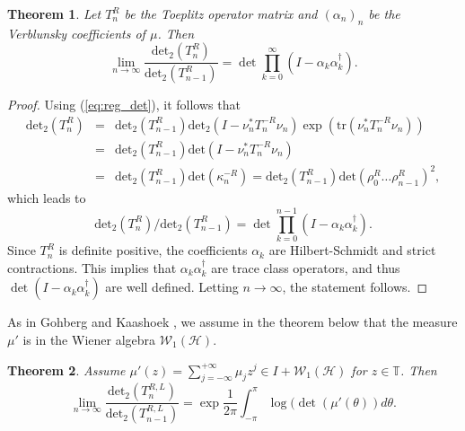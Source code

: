 \documentclass[11pt]{article}
\newtheorem{theorem}{Theorem}[section]
\begin{document}
\begin{theorem}
Let $T^{R}_{n}$ be the Toeplitz operator matrix and $(\alpha_n)_{n}$ be the Verblunsky coefficients of $\mu$.  Then 
$$
\lim_{n \rightarrow{ \infty}}\frac{\mathrm{det}_{2}(T^{R}_{n})}{\mathrm{det}_{2}(T^{R}_{n-1})}=\det \prod_{k=0}^{\infty} (I - {\alpha}_k {\alpha}_k^{\dag}).
$$
\end{theorem}
\begin{proof}
    Using (\ref{eq:reg_det}), it follows that 
    \begin{eqnarray*}
        \mathrm{det}_{2}(T^{R}_{n}) &=& \mathrm{det}_{2}(T^{R}_{n-1})\mathrm{det}_{2}(I - \nu^{*}_{n} T^{-R}_{n}\nu_{n}) \exp({\mathrm{tr}(\nu^{*}_{n} T^{-R}_{n}\nu_{n})})\\
        &=&\mathrm{det}_{2}(T^{R}_{n-1})\mathrm{det}(I - \nu^{*}_{n} T^{-R}_{n}\nu_{n})\\
        &=& \mathrm{det}_{2}(T^{R}_{n-1}) \mathrm{det}(\kappa^{-R}_{n})=\mathrm{det}_{2}(T^{R}_{n-1}) \mathrm{det}(\rho_{0}^{R} \dots \rho_{n-1}^{R})^{2},     
    \end{eqnarray*}
    which leads to $$\mathrm{det}_{2}(T^{R}_{n})/\mathrm{det}_{2}(T^{R}_{n-1}) = \det \prod_{k=0}^{n-1} (I - {\alpha}_k {\alpha}_k^{\dag}). $$
    Since $T^{R}_{n}$ is definite positive, the coefficients $\alpha_{k}$ are Hilbert-Schmidt and strict contractions. This implies that ${\alpha}_k {\alpha}_k^{\dag}$ are trace class operators, and thus $\det (I - {\alpha}_k {\alpha}_k^{\dag})$ are well defined.
    Letting $n \rightarrow \infty$, the statement follows.
\end{proof}

As in Gohberg and Kaashoek \cite{GohK}, we assume in the theorem below that the measure $\mu'$ is in the Wiener algebra $\mathcal{W}_{1}(\mathcal{H})$.

\begin{theorem}
Assume $\mu'(z)=\sum_{j=-\infty}^{+\infty}\mu_{j}z^{j}\in I + \mathcal{W}_{1}(\mathcal{H})$ for $z \in \mathbb{T}$. Then 
 \begin{equation} \label{szego_thm}
      \lim_{n \rightarrow{ \infty}}\frac{\mathrm{det_{2}}(T^{R,L}_{n})}{\mathrm{det_{2}}(T^{R,L}_{n-1})}
 = \exp \frac{1}{2\pi}\int_{-\pi}^{\pi} \log(\det(\mu'(\theta))d\theta. 
 \end{equation}
\end{theorem}
\end{document}
